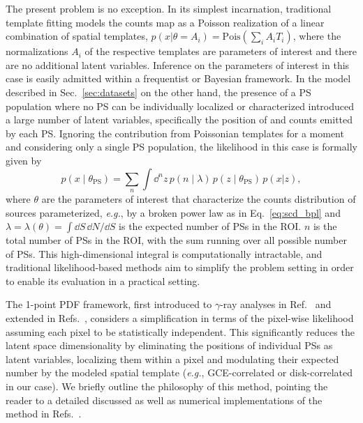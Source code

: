 \documentclass[prd,aps,10pt,nofootinbib,twocolumn,superscriptaddress,preprintnumbers,balancelastpage,longbibliography]{revtex4-1}
\begin{document}
The present problem is no exception. In its simplest incarnation, traditional template fitting models the counts map as a Poisson realization of a linear combination of spatial templates, $p(x|\theta = A_i) = \mathrm{Pois}\left(\sum_i A_i T_i\right)$, where the normalizations $A_i$ of the respective templates are parameters of interest and there are no additional latent variables. Inference on the parameters of interest in this case is easily admitted within a frequentist or Bayesian framework. In the model described in Sec.~\ref{sec:datasets} on the other hand, the presence of a PS population where no PS can be individually localized or characterized introduced a large number of latent variables, specifically the position of and counts emitted by each PS. Ignoring the contribution from Poissonian templates for a moment and considering only a single PS population, the likelihood in this case is formally given by
\begin{equation}
    \label{eq:data_likelihood}
    p(x\mid\theta_\mathrm{PS}) = \sum_{n} \int \dd^{n} z \, p\left(n\mid\lambda\right)\,p(z\mid\theta_\mathrm{PS})\,p(x|z),
\end{equation}
where $\theta$ are the parameters of interest that characterize the counts distribution of sources parameterized, \emph{e.g.}, by a broken power law as in Eq.~\eqref{eq:scd_bpl} and $\lambda = \lambda(\theta) = \int \dd S\, \dd N/\dd S$ is the expected number of PSs in the ROI. $n$ is the total number of PSs in the ROI, with the sum running over all possible number of PSs. This high-dimensional integral is computationally intractable, and traditional likelihood-based methods aim to simplify the problem setting in order to enable its evaluation in a practical setting.

The 1-point PDF framework, first introduced to $\gamma$-ray analyses in Ref.~\cite{Malyshev:2011zi} and extended in Refs.~\cite{Lee:2014mza,Lee:2015fea}, considers a simplification in terms of the pixel-wise likelihood assuming each pixel to be statistically independent. This significantly reduces the latent space dimensionality by eliminating the positions of individual PSs as latent variables, localizing them within a pixel and modulating their expected number by the modeled spatial template (\emph{e.g.}, GCE-correlated or disk-correlated in our case). We briefly outline the philosophy of this method, pointing the reader to a detailed discussed as well as numerical implementations of the method in Refs.~\cite{Lee:2015fea,Mishra-Sharma:2016gis}.
\end{document}
